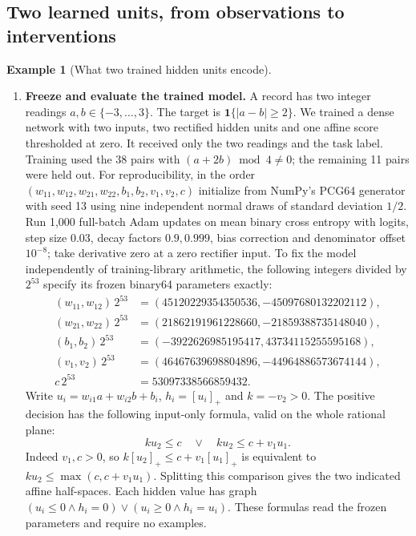 \documentclass[11pt,a4paper]{article}
\theoremstyle{definition}
\newtheorem{example}[example]{Example}
\theoremstyle{remark}\newaliascnt{remark}{theorem}
\numberwithin{equation}{section}
\begin{document}
\subsection{Two learned units, from observations to interventions}
\begin{example}[What two trained hidden units encode]\label{ex:trained-discrepancy}\leavevmode
\begin{enumerate}[titledsteps]
    \item \textbf{Freeze and evaluate the trained model.} A record has two integer readings $a,b\in\{-3,\ldots,3\}$. The target is $\mathbf1\{|a-b|\ge2\}$. We trained a dense network with two inputs, two rectified hidden units and one affine score thresholded at zero. It received only the two readings and the task label. Training used the 38 pairs with $(a+2b)\bmod4\ne0$; the remaining 11 pairs were held out. For reproducibility, in the order $(w_{11},w_{12},w_{21},w_{22},b_1,b_2,v_1,v_2,c)$ initialize from NumPy's PCG64 generator with seed 13 using nine independent normal draws of standard deviation $1/2$. Run 1,000 full-batch Adam updates on mean binary cross entropy with logits, step size $0.03$, decay factors $0.9,0.999$, bias correction and denominator offset $10^{-8}$; take derivative zero at a zero rectifier input. To fix the model independently of training-library arithmetic, the following integers divided by $2^{53}$ specify its frozen binary64 parameters exactly:
\[
\begin{aligned}
 (w_{11},w_{12})\,2^{53}&=(45120229354350536,-45097680132202112),\\
 (w_{21},w_{22})\,2^{53}&=(21862191961228660,-21859388735148040),\\
 (b_1,b_2)\,2^{53}&=(-3922626985195417,43734115255595168),\\
 (v_1,v_2)\,2^{53}&=(46467639698804896,-44964886573674144),\\
 c\,2^{53}&=53097338566859432 .
\end{aligned}
\]
Write $u_i=w_{i1}a+w_{i2}b+b_i$, $h_i=[u_i]_+$ and $k=-v_2>0$. The positive decision has the following input-only formula, valid on the whole rational plane:
\[
             k u_2\le c \quad\lor\quad k u_2\le c+v_1u_1 .
\]
Indeed $v_1,c>0$, so $k[u_2]_+\le c+v_1[u_1]_+$ is equivalent to $ku_2\le\max(c,c+v_1u_1)$. Splitting this comparison gives the two indicated affine half-spaces. Each hidden value has graph $(u_i\le0\wedge h_i=0)\lor(u_i\ge0\wedge h_i=u_i)$. These formulas read the frozen parameters and require no examples.


\end{enumerate}
\end{example}
\end{document}
